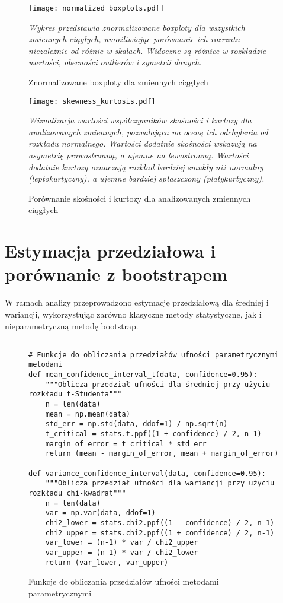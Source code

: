 \documentclass[12pt,a4paper]{article}
\newcommand{\kod}[2]{
    \begin{figure}[H]
        \begin{lstlisting}[style=pythonstyle]
#1
        \end{lstlisting}
        \caption{#2}
    \end{figure}
}
\begin{document}
\begin{figure}[H]
    \centering
    \texttt{[image: normalized\_boxplots.pdf]}
    \caption{Znormalizowane boxploty dla zmiennych ciągłych}
    \label{fig:normalized_boxplots}
    \small\textit{Wykres przedstawia znormalizowane boxploty dla wszystkich zmiennych ciągłych, umożliwiając porównanie ich rozrzutu niezależnie od różnic w skalach. Widoczne są różnice w rozkładzie wartości, obecności outlierów i symetrii danych.}
\end{figure}

\begin{figure}[H]
    \centering
    \texttt{[image: skewness\_kurtosis.pdf]}
    \caption{Porównanie skośności i kurtozy dla analizowanych zmiennych ciągłych}
    \label{fig:skewness_kurtosis}
    \small\textit{Wizualizacja wartości współczynników skośności i kurtozy dla analizowanych zmiennych, pozwalająca na ocenę ich odchylenia od rozkładu normalnego. Wartości dodatnie skośności wskazują na asymetrię prawostronną, a ujemne na lewostronną. Wartości dodatnie kurtozy oznaczają rozkład bardziej smukły niż normalny (leptokurtyczny), a ujemne bardziej spłaszczony (platykurtyczny).}
\end{figure}

\section{Estymacja przedziałowa i porównanie z bootstrapem}

W ramach analizy przeprowadzono estymację przedziałową dla średniej i wariancji, wykorzystując zarówno klasyczne metody statystyczne, jak i nieparametryczną metodę bootstrap.

\kod{
# Funkcje do obliczania przedziałów ufności parametrycznymi metodami
def mean_confidence_interval_t(data, confidence=0.95):
    """Oblicza przedział ufności dla średniej przy użyciu rozkładu t-Studenta"""
    n = len(data)
    mean = np.mean(data)
    std_err = np.std(data, ddof=1) / np.sqrt(n)
    t_critical = stats.t.ppf((1 + confidence) / 2, n-1)
    margin_of_error = t_critical * std_err
    return (mean - margin_of_error, mean + margin_of_error)

def variance_confidence_interval(data, confidence=0.95):
    """Oblicza przedział ufności dla wariancji przy użyciu rozkładu chi-kwadrat"""
    n = len(data)
    var = np.var(data, ddof=1)
    chi2_lower = stats.chi2.ppf((1 - confidence) / 2, n-1)
    chi2_upper = stats.chi2.ppf((1 + confidence) / 2, n-1)
    var_lower = (n-1) * var / chi2_upper
    var_upper = (n-1) * var / chi2_lower
    return (var_lower, var_upper)
}{Funkcje do obliczania przedziałów ufności metodami parametrycznymi}
\end{document}
